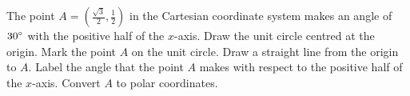 \documentclass[a4paper,oneside,12pt]{article}
\begin{document}
\begin{problem}
\item The point $A = (\frac{\sqrt{3}}{2}\comma \frac{1}{2})$ in the
  Cartesian coordinate system makes an angle of ${30}^{\circ}$ with the
  positive half of the $x$-axis.  Draw the unit circle centred at the
  origin.  Mark the point $A$ on the unit circle.  Draw a straight
  line from the origin to $A$.  Label the angle that the point $A$
  makes with respect to the positive half of the $x$-axis.  Convert
  $A$ to polar coordinates.


\end{problem}
\end{document}
